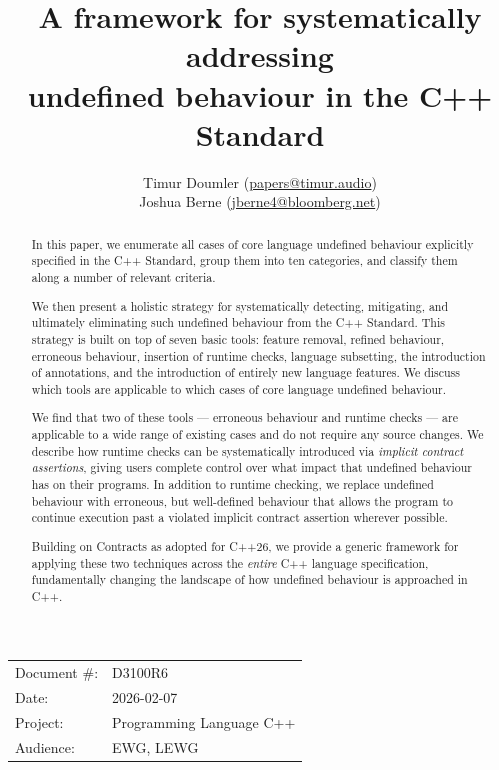 

\title{A framework for systematically addressing \\ undefined behaviour in the C++ Standard} 
\author{ Timur Doumler \small(\href{mailto:papers@timur.audio}{papers@timur.audio}) 
\\ Joshua Berne \small(\href{mailto:jberne4@bloomberg.net}{jberne4@bloomberg.net})  
}
\date{}
\maketitle

\begin{tabular}{ll}
Document \#: & D3100R6 \\
Date: &2026-02-07 \\
Project: & Programming Language C++ \\
Audience: & EWG, LEWG
\end{tabular}

\begin{abstract}
In this paper, we enumerate all cases of core language undefined behaviour explicitly specified in the C++ Standard,  group them into ten categories, and classify them along a number of relevant criteria.

We then present a holistic strategy for systematically detecting, mitigating, and ultimately eliminating such undefined behaviour from the C++ Standard. This strategy is built on top of seven basic tools: feature removal, refined behaviour, erroneous behaviour, insertion of runtime checks, language subsetting, the introduction of annotations, and the introduction of entirely new language features. We discuss which tools are applicable to which cases of core language undefined behaviour.

We find that two of these tools --- erroneous behaviour and runtime checks --- are applicable to a wide range of existing cases and do not require any source changes. We describe how runtime
checks can be systematically introduced via \emph{implicit contract assertions}, giving users complete
control over what impact that undefined behaviour has on their programs. In addition to runtime
checking, we replace undefined behaviour with erroneous, but well-defined behaviour that allows the program to continue execution past a violated implicit contract assertion wherever possible.

Building on Contracts as adopted for C++26, we provide a generic framework for applying these two techniques across the \emph{entire} C++ language specification, fundamentally changing the landscape of how undefined behaviour is approached in C++.
\end{abstract}


